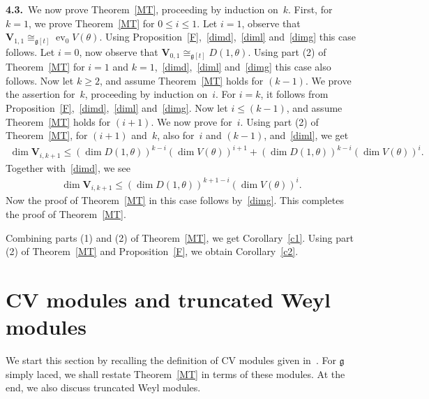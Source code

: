 \documentclass[pdftex]{sigma}
\DeclareMathOperator{\ev}{ev}
\numberwithin{equation}{section}
\begin{document}
{\bf 4.3.}~We now prove Theorem~\ref{MT}, proceeding by induction on~$k$.
First, for $k=1$, we prove Theorem~\ref{MT} for $0\leq i \leq 1$.
Let $i=1$, observe that $\mathbf{V}_{1,1} \cong_{\mathfrak{g}[t]} \ev_{0} V(\theta)$.
Using Proposition~\ref{F},~\eqref{dimd},~\eqref{diml} and~\eqref{dimg} this case follows.
Let $i=0$, now observe that $\mathbf{V}_{0,1} \cong_{\mathfrak{g}[t]} D(1,\theta)$.
Using part (2) of Theorem~\ref{MT} for $i=1$ and $k=1$,~\eqref{dimd},~\eqref{diml} and~\eqref{dimg} this case also
follows.
Now let $k\geq2$, and assume Theorem~\ref{MT} holds for $(k-1)$.
We prove the assertion for~$k$, proceeding by induction on~$i$.
For $i=k$, it follows from Proposition~\ref{F},~\eqref{dimd},~\eqref{diml} and~\eqref{dimg}.
Now let $i\leq (k-1)$, and assume Theorem~\ref{MT} holds for $(i+1)$.
We now prove for~$i$.
Using part (2) of Theorem~\ref{MT}, for $(i+1)$ and~$k$, also for~$i$ and $(k-1)$, and~\eqref{diml}, we get
\begin{gather*}
\dim \mathbf{V}_{i,k+1} \leq (\dim D(1, \theta))^{k-i} (\dim V(\theta))^{i+1} + (\dim D(1, \theta))^{k-i}
(\dim V(\theta))^{i}.
\end{gather*}
Together with~\eqref{dimd}, we see
\begin{gather*}
\dim \mathbf{V}_{i,k+1} \leq (\dim D(1,\theta))^{k+1-i} (\dim V(\theta))^{i}.
\end{gather*}
Now the proof of Theorem~\ref{MT} in this case follows by~\eqref{dimg}.
This completes the proof of Theorem~\ref{MT}.

Combining parts (1) and (2) of Theorem~\ref{MT}, we get Corollary~\ref{c1}.
Using part (2) of Theorem~\ref{MT} and Proposition~\ref{F}, we obtain Corollary~\ref{c2}.

\section{CV modules and truncated Weyl modules}\label{section5}

We start this section by recalling the def\/inition of CV modules given in~\cite{CV}.
For $\mathfrak{g}$ simply laced, we shall restate Theorem~\ref{MT} in terms of these modules.
At the end, we also discuss truncated Weyl modules.
\end{document}
